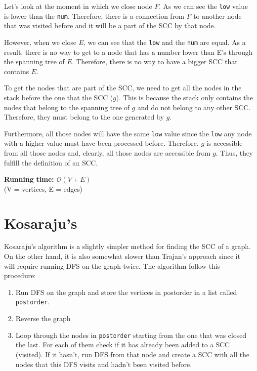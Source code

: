 \documentclass[12pt]{report}
\begin{document}
Let's look  at the moment in which we close node $F$. As we can see the \texttt{low}
value is lower than the \texttt{num}. Therefore, there is a connection from $F$ to
another node that was visited before and it will be a part of the SCC 
by that node.

However, when we close $E$, we can see that the \texttt{low} and the \texttt{num}
are equal. As a result, there is no way to get to a node that has a number lower than
E's through the spanning tree of $E$. Therefore, there is no way to have a bigger 
SCC that contains $E$.

To get the nodes that are part of the SCC, we need to get all the nodes in the stack before
the one that  the SCC ($g$). This is because the stack only contains the 
nodes that belong to the spanning tree of $g$ and do not belong to any other SCC. 
Therefore, they must belong to the one generated by $g$. 

Furthermore, all those nodes will have the same \texttt{low} value since the \texttt{low}
any node with a higher value must have been processed before. Therefore, $g$ is accessible
from all those nodes and, clearly, all those nodes are accessible from $g$.
Thus, they fulfill the definition of an SCC.



\newpage
{}
\noindent \textbf{\boldmath Running time: $\mathcal{O}(V+E)$}
\\ {\small (V = vertices, E = edges)}

\section{Kosaraju's}
Kosaraju's algorithm is a slightly simpler method for finding the SCC of a graph. 
On the other hand, it is also somewhat slower than Trajan's approach since it will
require running DFS on the graph twice. The algorithm follow this procedure:
\begin{enumerate}
	\item Run DFS on the graph and store the vertices in postorder in a list 
		called \texttt{postorder}.
	\item Reverse the graph
	\item Loop through the nodes in \texttt{postorder} starting from the one that 
		was closed the last. For each of them check if it has already been 
		added to a SCC (visited). If it hasn't, run DFS from that node and
		create a SCC with all the nodes that this DFS visits and hadn't been
		visited before.
\end{enumerate}
\end{document}
